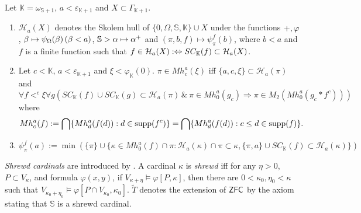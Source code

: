 \documentclass{article}
\newcommand{\mS}{\mathbb{S}}
\newcommand{\mK}{\mathbb{K}}
\begin{document}
\bdf\label{df:Cpsiregularsm}
{\rm
Let
$\mathbb{K}=\omega_{\mathbb{S}+1}$,
$a<\varepsilon_{\mathbb{K}+1}$ and $X\subset\Gamma_{\mathbb{K}+1}$.

\begin{enumerate}
\item\label{df:Cpsiregularsm.1}
$\mathcal{H}_{a}(X)$ denotes the Skolem hull of $\{0,\Omega,\mathbb{S},\mK\}\cup X$
under the functions
$+, \varphi$, 
$\beta\mapsto\psi_{\Omega}(\beta)\,(\beta<a)$,
$\mS>\alp\mapsto\alp^{+}$ and
$(\pi,b,f)\mapsto \psi_{\pi}^{f}(b)$, where $b<a$ and $f$ is a finite function such that
$f\in \mathcal{H}_{a}(X):\Lrarw SC_{\mK}(f)\subset\mathcal{H}_{a}(X)$.








\item\label{df:Cpsiregularsm.2}
Let $c<\mathbb{K}$, $a<\varepsilon_{\mathbb{K}+1}$ and $\xi<\varphi_{\mathbb{K}}(0)$.
$\pi\in Mh^{a}_{c}(\xi)$ iff 
$\{a,c,\xi\}\subset\mathcal{H}_{a}(\pi)$ and
{\small
\begin{equation}\label{eq:dfMhkh}
 \forall f<^{c}\xi 
 \forall g \left(
 SC_{\mK}(f)\cup SC_{\mK}(g) \subset\mathcal{H}_{a}(\pi) 
 \,\&\, 
\pi\in Mh^{a}_{0}(g_{c})
 \Rightarrow \pi\in M_{2}(Mh^{a}_{0}(g_{c}*f^{c}))
 \right)
\end{equation}
}
where 
\[
Mh^{a}_{c}(f)  :=  \bigcap\{Mh^{a}_{d}(f(d)): d\in {\rm supp}(f^{c})\}
=
\bigcap\{Mh^{a}_{d}(f(d)): c\leq d\in {\rm supp}(f)\}.
\]




\item\label{df:Cpsiregularsm.3}
{\small
\begin{equation}\label{eq:Psivec}
\psi_{\pi}^{f}(a)
 :=  \min(\{\pi\}\cup\{\kappa\in Mh^{a}_{0}(f)\cap\pi:   \mathcal{H}_{a}(\kappa)\cap\pi\subset\kappa ,
   \{\pi,a\}\cup SC_{\mK}(f)\subset\mathcal{H}_{a}(\kappa)
\})
\end{equation}
}



\end{enumerate}
}

\edf







\textit{Shrewd cardinals} are introduced by \cite{RathjenAFML2}.
A cardinal $\kappa$ is \textit{shrewd} iff for any $\eta>0$, $P\subset V_{\kappa}$,
and formula $\varphi(x,y)$, if
$V_{\kappa+\eta}\models\varphi[P,\kappa]$, then there are $0<\kappa_{0},\eta_{0}<\kappa$ such that
$V_{\kappa_{0}+\eta_{0}}\models\varphi[P\cap V_{\kappa_{0}},\kappa_{0}]$.
$\tilde{T}$ denotes the extension of ${\sf ZFC}$ by the axiom stating that
$\mathbb{S}$ is a shrewd cardinal.
\end{document}
